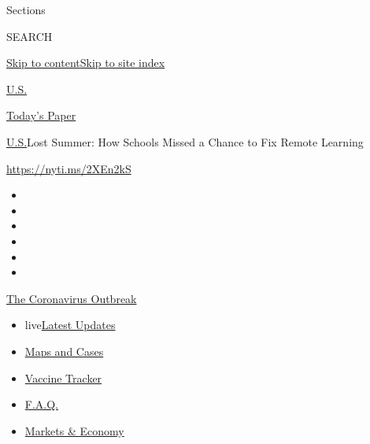 Sections

SEARCH

\protect\hyperlink{site-content}{Skip to
content}\protect\hyperlink{site-index}{Skip to site index}

\href{https://www.nytimes3xbfgragh.onion/section/us}{U.S.}

\href{https://myaccount.nytimes3xbfgragh.onion/auth/login?response_type=cookie\&client_id=vi}{}

\href{https://www.nytimes3xbfgragh.onion/section/todayspaper}{Today's
Paper}

\href{/section/us}{U.S.}\textbar{}Lost Summer: How Schools Missed a
Chance to Fix Remote Learning

\href{https://nyti.ms/2XEn2kS}{https://nyti.ms/2XEn2kS}

\begin{itemize}
\item
\item
\item
\item
\item
\item
\end{itemize}

\href{https://www.nytimes3xbfgragh.onion/news-event/coronavirus?action=click\&pgtype=Article\&state=default\&region=TOP_BANNER\&context=storylines_menu}{The
Coronavirus Outbreak}

\begin{itemize}
\tightlist
\item
  live\href{https://www.nytimes3xbfgragh.onion/2020/08/07/world/covid-19-news.html?action=click\&pgtype=Article\&state=default\&region=TOP_BANNER\&context=storylines_menu}{Latest
  Updates}
\item
  \href{https://www.nytimes3xbfgragh.onion/interactive/2020/us/coronavirus-us-cases.html?action=click\&pgtype=Article\&state=default\&region=TOP_BANNER\&context=storylines_menu}{Maps
  and Cases}
\item
  \href{https://www.nytimes3xbfgragh.onion/interactive/2020/science/coronavirus-vaccine-tracker.html?action=click\&pgtype=Article\&state=default\&region=TOP_BANNER\&context=storylines_menu}{Vaccine
  Tracker}
\item
  \href{https://www.nytimes3xbfgragh.onion/interactive/2020/world/coronavirus-tips-advice.html?action=click\&pgtype=Article\&state=default\&region=TOP_BANNER\&context=storylines_menu}{F.A.Q.}
\item
  \href{https://www.nytimes3xbfgragh.onion/live/2020/08/07/business/stock-market-today-coronavirus?action=click\&pgtype=Article\&state=default\&region=TOP_BANNER\&context=storylines_menu}{Markets
  \& Economy}
\end{itemize}

